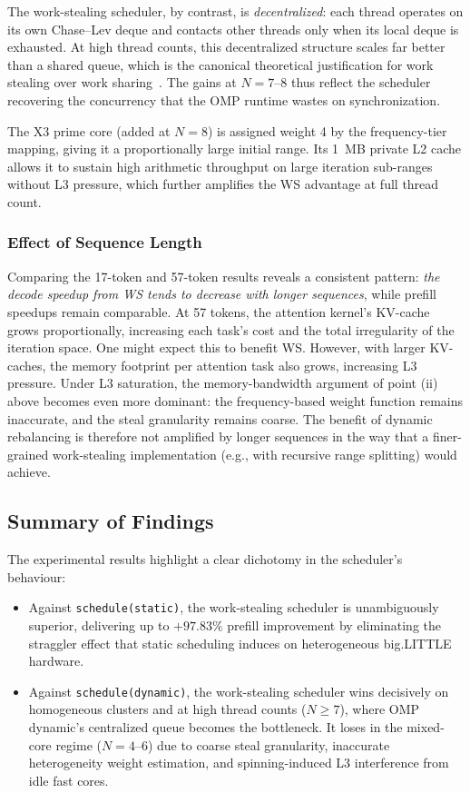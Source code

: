 \documentclass[11pt,english]{article}
\begin{document}
The work-stealing scheduler, by contrast, is \emph{decentralized}: each thread operates on its own Chase--Lev deque and contacts other threads only when its local deque is exhausted. At high thread counts, this decentralized structure scales far better than a shared queue, which is the canonical theoretical justification for work stealing over work sharing~\cite{blumofe1999workstealing}. The gains at $N=7$--$8$ thus reflect the scheduler recovering the concurrency that the OMP runtime wastes on synchronization.
 
The X3 prime core (added at $N=8$) is assigned weight 4 by the frequency-tier mapping, giving it a proportionally large initial range. Its 1~MB private L2 cache allows it to sustain high arithmetic throughput on large iteration sub-ranges without L3 pressure, which further amplifies the WS advantage at full thread count.

 
\subsubsection{Effect of Sequence Length}
 
Comparing the 17-token and 57-token results reveals a consistent pattern: \emph{the decode speedup from WS tends to decrease with longer sequences}, while prefill speedups remain comparable. At 57 tokens, the attention kernel's KV-cache grows proportionally, increasing each task's cost and the total irregularity of the iteration space. One might expect this to benefit WS. However, with larger KV-caches, the memory footprint per attention task also grows, increasing L3 pressure. Under L3 saturation, the memory-bandwidth argument of point (ii) above becomes even more dominant: the frequency-based weight function remains inaccurate, and the steal granularity remains coarse. The benefit of dynamic rebalancing is therefore not amplified by longer sequences in the way that a finer-grained work-stealing implementation (e.g., with recursive range splitting) would achieve.
 
\subsection{Summary of Findings}
 
The experimental results highlight a clear dichotomy in the scheduler's behaviour:
 
\begin{itemize}
    \item Against \texttt{schedule(static)}, the work-stealing scheduler is unambiguously superior, delivering up to $+97.83\%$ prefill improvement by eliminating the straggler effect that static scheduling induces on heterogeneous big.LITTLE hardware.
    \item Against \texttt{schedule(dynamic)}, the work-stealing scheduler wins decisively on homogeneous clusters and at high thread counts ($N \geq 7$), where OMP dynamic's centralized queue becomes the bottleneck. It loses in the mixed-core regime ($N = 4$--$6$) due to coarse steal granularity, inaccurate heterogeneity weight estimation, and spinning-induced L3 interference from idle fast cores.
\end{itemize}
 
\end{document}
